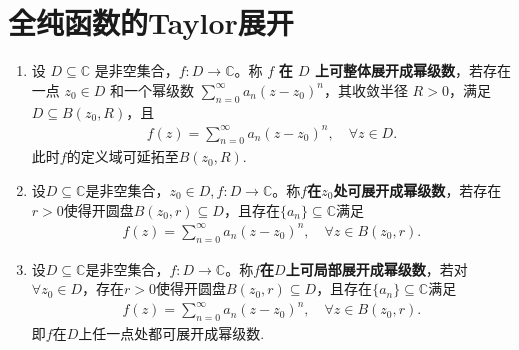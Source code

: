 \documentclass[../../main.tex]{subfiles}%
\begin{document}
\section{全纯函数的Taylor展开}

\begin{definition}
\begin{enumerate}
\item 设 $D \subseteq \mathbb{C}$ 是非空集合，$f: D \to \mathbb{C}$。称 $f$ \textbf{在 $D$ 上可整体展开成幂级数}，若存在一点 $z_0 \in D$ 和一个幂级数 $\sum_{n=0}^{\infty} a_n (z - z_0)^n$，其收敛半径 $R > 0$，满足 $D \subseteq B(z_0, R)$，且
\begin{align*}
f(z) = \sum_{n=0}^{\infty} a_n (z - z_0)^n,\quad \forall z \in D.
\end{align*}
此时$f$的定义域可延拓至$B(z_0,R)$.

\item 设$D \subseteq \mathbb{C}$是非空集合，$z_0\in D$,$\,f: D \to \mathbb{C}$。称$f$\textbf{在$z_0$处可展开成幂级数}，若存在$r > 0$使得开圆盘$B(z_0, r) \subseteq D$，且存在$\{a_n\}\subseteq \mathbb{C}$满足
\begin{align*}
f(z) = \sum\limits_{n=0}^{\infty} a_n (z - z_0)^n, \quad \forall z \in B(z_0, r).
\end{align*}

\item 设$D \subseteq \mathbb{C}$是非空集合，$f: D \to \mathbb{C}$。称$f$\textbf{在$D$上可局部展开成幂级数}，若对$\forall z_0 \in D$，存在$r > 0$使得开圆盘$B(z_0, r) \subseteq D$，且存在$\{a_n\}\subseteq \mathbb{C}$满足
\begin{align*}
f(z) = \sum\limits_{n=0}^{\infty} a_n (z - z_0)^n, \quad \forall z \in B(z_0, r).
\end{align*}
即$f$在$D$上任一点处都可展开成幂级数.
\end{enumerate}
\end{definition}
\end{document}
